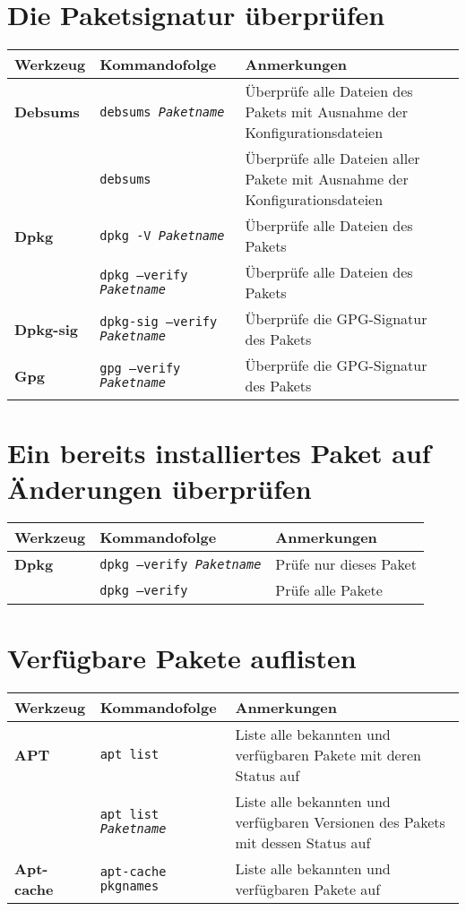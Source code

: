 \documentclass[10pt,a4paper]{article}
\begin{document}
\newpage
\cheatsheet

\section{Die Paketsignatur überprüfen}
\begin{tabular}{ p{3.5cm} p{9.6cm} p{11cm}}
  \hline
  \rowcolor{Gray}
  \textbf{Werkzeug} & \textbf{Kommandofolge} & \textbf{Anmerkungen} \\
  \hline 
  \textbf{Debsums} & \texttt{debsums \textit{Paketname}} & Überprüfe alle Dateien des Pakets mit Ausnahme der Konfigurationsdateien\\
  \rowcolor{Gray}
  ~ & \texttt{debsums} & Überprüfe alle Dateien aller Pakete mit Ausnahme der Konfigurationsdateien \\
  \textbf{Dpkg} & \texttt{dpkg -V \textit{Paketname}} & Überprüfe alle Dateien des Pakets \\
  \rowcolor{Gray}
  & \texttt{dpkg --verify \textit{Paketname}} & Überprüfe alle Dateien des Pakets \\
  \textbf{Dpkg-sig} & \texttt{dpkg-sig --verify \textit{Paketname}} & Überprüfe die GPG-Signatur des Pakets \\
  \rowcolor{Gray}
  \textbf{Gpg} & \texttt{gpg --verify \textit{Paketname}} & Überprüfe die GPG-Signatur des Pakets \\
  \hline
\end{tabular}

\section{Ein bereits installiertes Paket auf Änderungen überprüfen}
\begin{tabular}{ p{3.5cm} p{9.6cm} p{11cm}}
  \hline
  \rowcolor{Gray}
  \textbf{Werkzeug} & \textbf{Kommandofolge} & \textbf{Anmerkungen} \\
  \hline 
  \textbf{Dpkg} & \texttt{dpkg --verify \textit{Paketname}} & Prüfe nur dieses Paket \\
  \rowcolor{Gray}
  & \texttt{dpkg --verify} & Prüfe alle Pakete \\
  \hline
\end{tabular}

\section{Verfügbare Pakete auflisten}
\begin{tabular}{ p{3.5cm} p{9.6cm} p{11cm}}
  \hline
  \rowcolor{Gray}
  \textbf{Werkzeug} & \textbf{Kommandofolge} & \textbf{Anmerkungen} \\
  \hline 
  \textbf{APT} & \texttt{apt list} & Liste alle bekannten und verfügbaren Pakete mit deren Status auf\\
  \rowcolor{Gray}
  & \texttt{apt list \textit{Paketname}} & Liste alle bekannten und verfügbaren Versionen des Pakets mit dessen Status auf\\
  \textbf{Apt-cache} & \texttt{apt-cache pkgnames} & Liste alle bekannten und verfügbaren Pakete auf\\
  \hline
\end{tabular}
\end{document}
